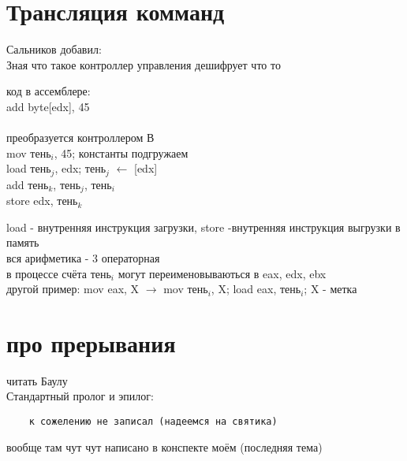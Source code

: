 \documentclass[a4paper,10pt]{article}
\begin{document}
\section*{Трансляция комманд}
Сальников добавил: \\
Зная что такое контроллер управления дешифрует что то
\begin{multicols}{2}
\noindent
код в ассемблере: \\
add byte[edx], 45 \\
\columnbreak \\
преобразуется контроллером В \\
mov тень$_i$, 45; константы подгружаем \\
load тень$_j$, edx; тень$_j$ $\leftarrow$ [edx] \\
add тень$_k$, тень$_j$, тень$_i$ \\
store edx, тень$_k$ 
\end{multicols}
load - внутренняя инструкция загрузки, store -внутренняя инструкция выгрузки в память\\
вся арифметика - 3 операторная \\ в процессе  счёта тень$_i$ могут переименовываються в eax, edx, ebx \\
другой пример: mov eax, X $\rightarrow$ mov тень$_i$, X; load eax, тень$_i$; X - метка \\
\section*{про прерывания}
читать Баулу \\ Стандартный пролог и эпилог:
\begin{verbatim}
    к сожелению не записал (надеемся на святика)
\end{verbatim}
вообще там чут чут написано в конспекте моём (последняя тема)
\end{document}
